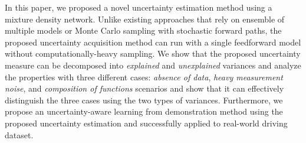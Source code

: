 \documentclass[letterpaper, 10 pt, conference]{ieeeconf}  %
\begin{document}
In this paper, we proposed a novel uncertainty estimation method
using a mixture density network. 
Unlike existing approaches that rely on ensemble of multiple models
or Monte Carlo sampling with stochastic forward paths, 
the proposed uncertainty acquisition method can run with 
a single feedforward model without computationally-heavy sampling. 
We show that the proposed uncertainty measure can be decomposed
into \textit{explained} and \textit{unexplained} variances 
and analyze the properties with three different cases: 
\textit{absence of data}, \textit{heavy measurement noise}, 
and \textit{composition of functions} scenarios and
show that it can effectively distinguish the three cases using 
the two types of variances.
Furthermore, we propose an uncertainty-aware 
learning from demonstration method
using the proposed uncertainty estimation and 
successfully applied to real-world driving dataset. 



\end{document}
